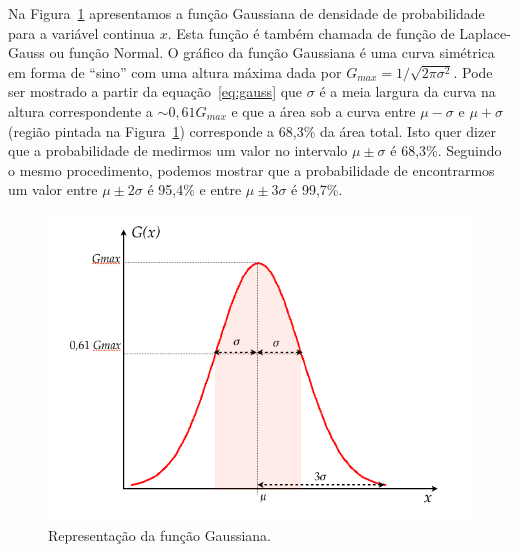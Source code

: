Na Figura~\ref{fig:gauss} apresentamos a função Gaussiana de densidade de probabilidade para a variável continua $x$.  Esta função é também chamada de função de Laplace-Gauss ou função Normal. O gráfico da função Gaussiana é uma curva simétrica em forma de ``sino'' \-com uma altura máxima dada por $G_{max} = 1/\sqrt{2 \pi \sigma^2}$. Pode ser mostrado a partir da equação~\ref{eq:gauss} que 
$\sigma$ é a meia largura da curva na altura correspondente a $\sim 0,61 G_{max}$ e que a área sob a curva entre $\mu - \sigma$ e $\mu + \sigma$ (região pintada na Figura~\ref{fig:gauss}) corresponde a 68,3\% da área total. Isto quer dizer que a probabilidade de medirmos um valor no intervalo $\mu \pm \sigma$ é 68,3\%. Seguindo o mesmo procedimento, podemos mostrar que a probabilidade de encontrarmos um valor entre  $\mu \pm 2\sigma$ é 95,4\% e entre $\mu \pm 3\sigma$ é 99,7\%.


\begin{figure}[t]
\begin{center}
\includegraphics[width=14cm]{fig/Gauss.png}
\caption{\label{fig:gauss} Representação da função Gaussiana.}
\end{center}
\end{figure}

